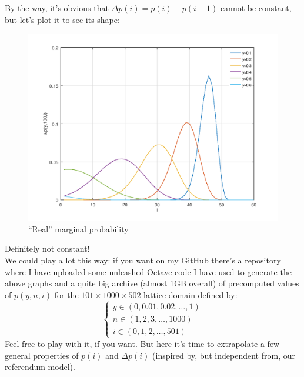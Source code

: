 \documentclass[10pt,a4paper]{article}
\begin{document}
	By the way, it’s obvious that $\Delta p(i) = p(i)-p(i-1)$ cannot be constant, but let’s plot it to see its shape:
	\begin{figure}[H]	
		\centering
		\includegraphics[height=0.33\textheight]{FIG/marginalp.png}
		\caption{\enquote{Real} marginal probability}
		\label{fig:marginalp}
	\end{figure}
	Definitely not constant!\\
	We could play a lot this way: if you want on my GitHub there’s a repository \cite{Github} where I have uploaded some unleashed Octave code I have used to generate the above graphs and a quite big archive (almost 1GB overall) of precomputed values of $p(y,n,i)$ for the $101 \times 1000 \times 502$ lattice domain defined by:
	\begin{equation*}
		\begin{cases} 
			y \in(0, 0.01, 0.02, \dots, 1)\\
			n \in(1, 2, 3, \dots, 1000)\\
			i \in(0, 1, 2, \dots, 501)
		\end{cases}
	\end{equation*}
	Feel free to play with it, if you want. But here it’s time to extrapolate a few general properties of $p(i)$ and $\Delta p(i)$ (inspired by, but independent from, our referendum model).
	
\end{document}
